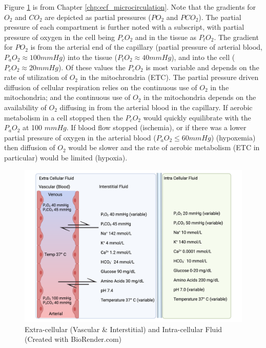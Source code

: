 Figure \ref{fig:ecf_respiration} is from Chapter \ref{chp:ecf_microcirculation}. Note that the gradients for $O_2$ and $CO_2$ are depicted as partial pressures ($PO_2$ and $PCO_2$). The partial pressure of each compartment is further noted with a subscript, with partial pressure of oxygen in the cell being $P_cO_2$ and in the tissue as $P_tO_2$. The gradient for $PO_2$ is from the arterial end of the capillary (partial pressure of arterial blood, $P_aO_2 \approx 100 mmHg$) into the tissue ($P_tO_2 \approx 40 mmHg$), and into the cell ($P_cO_2 \approx 20 mmHg$). Of these values the $P_cO_2$ is most variable and depends on the rate of utilization of $O_2$ in the mitochrondria (ETC). The partial pressure driven diffusion of cellular respiration relies on the continuous use of $O_2$ in the mitochondria; and the continuous use of $O_2$ in the mitochondria depends on the availability of $O_2$ diffusing in from the arterial blood in the capillary. If aerobic metabolism in a cell stopped then the $P_cO_2$ would quickly equilibrate with the $P_aO_2$ at 100 $mmHg$. If blood flow stopped (ischemia), or if there was a lower partial pressure of oxygen in the arterial blood ($P_aO_2 \leq 60 mmHg$) (hypoxemia) then diffusion of $O_2$ would be slower and the rate of aerobic metabolism (ETC in particular) would be limited (hypoxia).

\begin{figure}[!h]
    \centering
    \includegraphics[width=1.0\linewidth]{./figure/ecf.png}
    \caption{Extra-cellular (Vascular \& Interstitial) and Intra-cellular Fluid \footnotesize{(Created with BioRender.com)}}
    \label{fig:ecf_respiration}
\end{figure}

